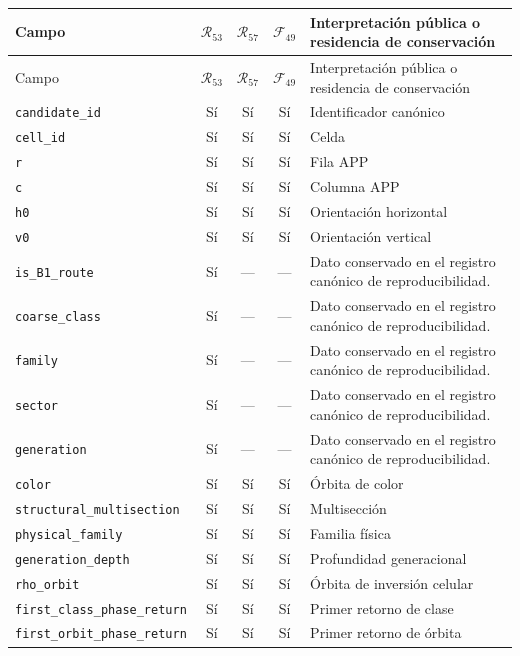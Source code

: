 \begingroup
\small
\useOriginalUrlSetting
\setlength{\LTpre}{0.5\baselineskip}
\setlength{\LTpost}{0.5\baselineskip}
\begin{longtable}{p{}ccc p{}}
\hline
Campo & \(\mathcal R_{53}\) & \(\mathcal R_{57}\) & \(\mathcal F_{49}\) & Interpretación pública o residencia de conservación \\
\hline
\endfirsthead
\hline
Campo & \(\mathcal R_{53}\) & \(\mathcal R_{57}\) & \(\mathcal F_{49}\) & Interpretación pública o residencia de conservación \\
\hline
\endhead
\nolinkurl{candidate_id} & Sí & Sí & Sí & Identificador canónico \\
\nolinkurl{cell_id} & Sí & Sí & Sí & Celda \\
\nolinkurl{r} & Sí & Sí & Sí & Fila APP \\
\nolinkurl{c} & Sí & Sí & Sí & Columna APP \\
\nolinkurl{h0} & Sí & Sí & Sí & Orientación horizontal \\
\nolinkurl{v0} & Sí & Sí & Sí & Orientación vertical \\
\nolinkurl{is_B1_route} & Sí & --- & --- & Dato conservado en el registro canónico de reproducibilidad. \\
\nolinkurl{coarse_class} & Sí & --- & --- & Dato conservado en el registro canónico de reproducibilidad. \\
\nolinkurl{family} & Sí & --- & --- & Dato conservado en el registro canónico de reproducibilidad. \\
\nolinkurl{sector} & Sí & --- & --- & Dato conservado en el registro canónico de reproducibilidad. \\
\nolinkurl{generation} & Sí & --- & --- & Dato conservado en el registro canónico de reproducibilidad. \\
\nolinkurl{color} & Sí & Sí & Sí & Órbita de color \\
\nolinkurl{structural_multisection} & Sí & Sí & Sí & Multisección \\
\nolinkurl{physical_family} & Sí & Sí & Sí & Familia física \\
\nolinkurl{generation_depth} & Sí & Sí & Sí & Profundidad generacional \\
\nolinkurl{rho_orbit} & Sí & Sí & Sí & Órbita de inversión celular \\
\nolinkurl{first_class_phase_return} & Sí & Sí & Sí & Primer retorno de clase \\
\nolinkurl{first_orbit_phase_return} & Sí & Sí & Sí & Primer retorno de órbita \\

\end{longtable}
